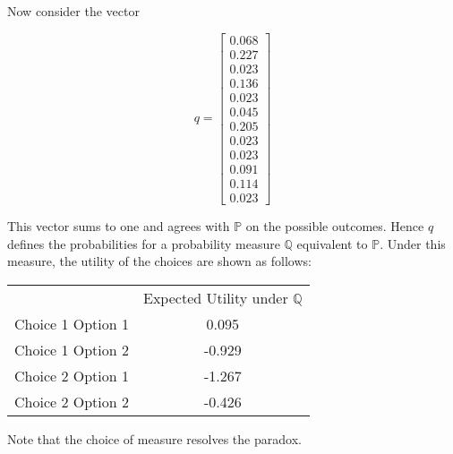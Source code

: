 \documentclass{article}
\begin{document}
Now consider the vector 

\[q=\begin{bmatrix}
0.068 \\
0.227 \\
0.023 \\
0.136 \\
0.023 \\
0.045 \\
0.205 \\
0.023 \\ 
0.023 \\
0.091 \\
0.114 \\
0.023
\end{bmatrix}\]

This vector sums to one and agrees with \(\mathbb{P}\) on the possible outcomes.  Hence \(q\) defines the probabilities for a probability measure \(\mathbb{Q}\) equivalent to \(\mathbb{P}\).  Under this measure, the utility of the choices are shown as follows:

\begin{center} 
	\begin{tabular}{c c}
		& Expected Utility under \(\mathbb{Q}\) \\
		Choice 1 Option 1 & 0.095 \\
		Choice 1 Option 2 & -0.929 \\
		Choice 2 Option 1 & -1.267 \\
		Choice 2 Option 2 & -0.426 
	\end{tabular}
\end{center}

Note that the choice of measure resolves the paradox.  
\end{document}

